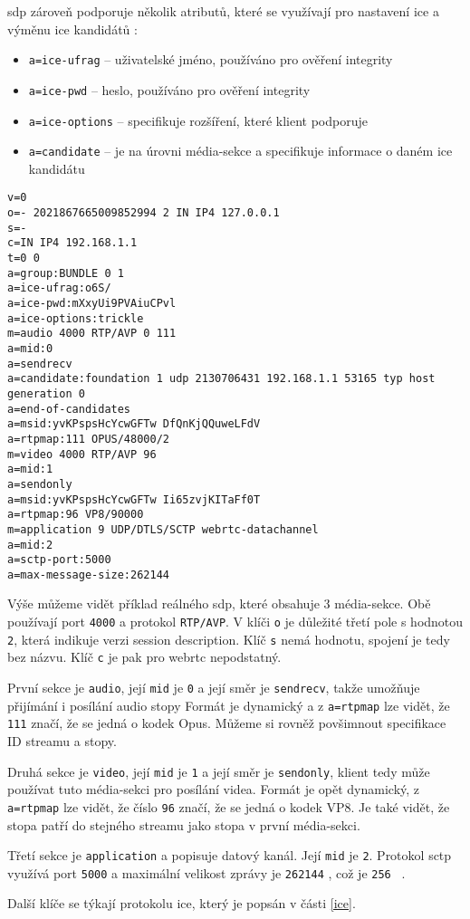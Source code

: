 \gls{sdp} zároveň podporuje několik atributů, které se využívají pro nastavení
\gls{ice} a výměnu \gls{ice} kandidátů
\parencite{WebRTCForTheCurious,IETF-RFC8839}:
\begin{itemize}
    \item \texttt{a=ice-ufrag} -- uživatelské jméno, používáno pro
          ověření integrity
    \item \texttt{a=ice-pwd} -- heslo, používáno pro ověření integrity
    \item \texttt{a=ice-options} -- specifikuje rozšíření, které
          klient podporuje
    \item \texttt{a=candidate} -- je na úrovni média-sekce a
          specifikuje informace o daném \gls{ice} kandidátu
\end{itemize}

\begin{verbatim}
v=0
o=- 2021867665009852994 2 IN IP4 127.0.0.1
s=-
c=IN IP4 192.168.1.1
t=0 0
a=group:BUNDLE 0 1
a=ice-ufrag:o6S/
a=ice-pwd:mXxyUi9PVAiuCPvl
a=ice-options:trickle
m=audio 4000 RTP/AVP 0 111
a=mid:0
a=sendrecv
a=candidate:foundation 1 udp 2130706431 192.168.1.1 53165 typ host generation 0
a=end-of-candidates
a=msid:yvKPspsHcYcwGFTw DfQnKjQQuweLFdV
a=rtpmap:111 OPUS/48000/2
m=video 4000 RTP/AVP 96
a=mid:1
a=sendonly
a=msid:yvKPspsHcYcwGFTw Ii65zvjKITaFf0T
a=rtpmap:96 VP8/90000
m=application 9 UDP/DTLS/SCTP webrtc-datachannel
a=mid:2
a=sctp-port:5000
a=max-message-size:262144
\end{verbatim}

Výše můžeme vidět příklad reálného \gls{sdp}, které obsahuje 3 média-sekce. Obě
používají port \texttt{4000} a protokol \texttt{RTP/AVP}. V
klíči \texttt{o} je důležité třetí pole s hodnotou
\texttt{2}, která indikuje verzi session description. Klíč
\texttt{s} nemá hodnotu, spojení je tedy bez názvu. Klíč
\texttt{c} je pak pro \gls{webrtc} nepodstatný.

První sekce je \texttt{audio}, její \texttt{mid} je
\texttt{0} a její směr je \texttt{sendrecv}, takže umožňuje
přijímání i posílání audio stopy Formát je dynamický a z
\texttt{a=rtpmap} lze vidět, že \texttt{111} značí, že se
jedná o kodek Opus. Můžeme si rovněž povšimnout specifikace ID streamu a stopy.

Druhá sekce je \texttt{video}, její \texttt{mid} je
\texttt{1} a její směr je \texttt{sendonly}, klient tedy
může používat tuto média-sekci pro posílání videa. Formát je opět dynamický, z
\texttt{a=rtpmap} lze vidět, že číslo \texttt{96} značí, že
se jedná o kodek VP8. Je také vidět, že stopa patří do stejného streamu jako
stopa v první média-sekci.

Třetí sekce je \texttt{application} a popisuje datový kanál. Její
\texttt{mid} je \texttt{2}. Protokol \gls{sctp} využívá port
\texttt{5000} a maximální velikost zprávy je \texttt{262144}
\si{\byte}, což je \texttt{256} \si{\kibi\byte}.

Další klíče se týkají protokolu \gls{ice}, který je popsán v části \ref{ice}.
